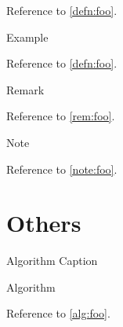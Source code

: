 Reference to \cref{defn:foo}.

\begin{exmp}\label{exmp:foo}
  Example
\end{exmp}

Reference to \cref{defn:foo}.

\begin{rem}\label{rem:foo}
  Remark
\end{rem}

Reference to \cref{rem:foo}.

\begin{note}\label{note:foo}
  Note
\end{note}

Reference to \cref{note:foo}.

\section {Others}
\begin{algorithm}
  \caption{Algorithm Caption\label{alg:foo}}
  Algorithm
\end{algorithm}

Reference to \cref{alg:foo}.


